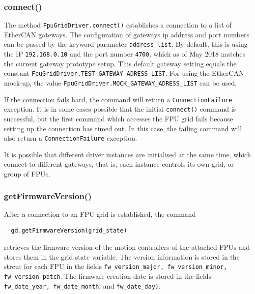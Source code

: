 \documentclass[11pt,a4paper]{report}
\begin{document}
\subsubsection{connect()}
\label{sec:connect}
     The method
\texttt{FpuGridDriver.connect()} establishes a connection to a list of
EtherCAN gateways. The configuration of gateways ip address and port
numbers can be passed by the keyword parameter
\texttt{address\_list}. By default, this is using the IP
\texttt{192.168.0.10} and the port number \texttt{4700}, which as of
May 2018 matches the current gateway prototype setup. This default
gateway setting equals the constant
\texttt{FpuGridDriver.TEST\_GATEWAY\_ADRESS\_LIST}.  For using the
EtherCAN mock-up, the value
\texttt{FpuGridDriver.MOCK\_GATEWAY\_ADRESS\_LIST} can be used.

If the connection fails hard, the command will return a
\texttt{ConnectionFailure} exception.  It is in some cases possible
that the initial \texttt{connect()} command is successful, but the
first command which accesses the FPU grid fails because setting up the
connection has timed out. In this case, the failing command will
also return a \texttt{ConnectionFailure} exception.

It is possible that different driver instances are initialised at the
same time, which connect to different gateways, that is, each instance
controls its own grid, or group of FPUs.

\subsubsection{getFirmwareVersion()}
\label{sec:getfirmwareversion}

After a connection to an FPU grid is established, the command
\begin{verbatim}
  gd.getFirmwareVersion(grid_state)
\end{verbatim}
retrieves the firmware version of the motion controllers of the
attached FPUs and stores them in the grid state variable. The version
information is stored in the strcut for each FPU in the fields
\texttt{fw\_version\_major, fw\_version\_minor, fw\_version\_patch}.
The firmware creation date is stored in the fields
\texttt{fw\_date\_year, fw\_date\_month}, and \texttt{fw\_date\_day)}.
\end{document}
